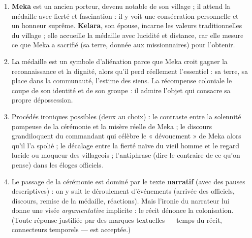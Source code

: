 \documentclass[11pt]{article}
\newcommand{\cle}[1]{{\popxbold\color{popdark}#1}}
\begin{document}
\begin{corrige}
\begin{enumerate}
\item \textbf{Meka} est un ancien porteur, devenu notable de son village ; il attend la médaille avec fierté et fascination : il y voit une consécration personnelle et un honneur suprême. \textbf{Kelara}, son épouse, incarne les valeurs traditionnelles du village ; elle accueille la médaille avec lucidité et distance, car elle mesure ce que Meka a sacrifié (sa terre, donnée aux missionnaires) pour l'obtenir.
\item La médaille est un symbole d'\cle{aliénation} parce que Meka croit gagner la reconnaissance et la dignité, alors qu'il perd réellement l'essentiel : sa terre, sa place dans la communauté, l'estime des siens. La récompense coloniale le coupe de son identité et de son groupe : il admire l'objet qui consacre sa propre dépossession.
\item Procédés ironiques possibles (deux au choix) : le contraste entre la solennité pompeuse de la cérémonie et la misère réelle de Meka ; le discours grandiloquent du commandant qui célèbre le « dévouement » de Meka alors qu'il l'a spolié ; le décalage entre la fierté naïve du vieil homme et le regard lucide ou moqueur des villageois ; l'antiphrase (dire le contraire de ce qu'on pense) dans les éloges officiels.
\item Le passage de la cérémonie est dominé par le texte \textbf{narratif} (avec des pauses descriptives) : on y suit le déroulement d'événements (arrivée des officiels, discours, remise de la médaille, réactions). Mais l'ironie du narrateur lui donne une visée \emph{argumentative} implicite : le récit dénonce la colonisation. (Toute réponse justifiée par des marques textuelles — temps du récit, connecteurs temporels — est acceptée.)
\end{enumerate}
\end{corrige}
\end{document}
